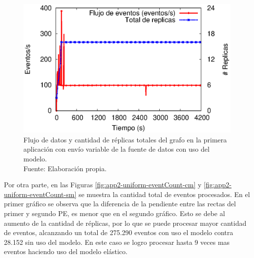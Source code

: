 \begin{figure}[!ht]
	\centering
	\captionsetup{justification=centering}
	\includegraphics[scale=0.7]{images/exp/app2/uniform/cm/processSystem.eps}
    \caption[Flujo de datos y cantidad de réplicas totales del grafo en la primera aplicación con envío variable de la fuente de datos con uso del modelo.]{Flujo de datos y cantidad de réplicas totales del grafo en la primera aplicación con envío variable de la fuente de datos con uso del modelo.\\Fuente: Elaboración propia.}
	\label{fig:app2-uniform-processSystem-cm}
\end{figure}



Por otra parte, en las Figuras \ref{fig:app2-uniform-eventCount-cm} y \ref{fig:app2-uniform-eventCount-sm} se muestra la cantidad total de eventos procesados. En el primer gráfico se observa que la diferencia de la pendiente entre las rectas del primer y segundo PE, es menor que en el segundo gráfico. Esto se debe al aumento de la cantidad de réplicas, por lo que se puede procesar mayor cantidad de eventos, alcanzando un total de 275.290 eventos con uso el modelo contra 28.152 sin uso del modelo. En este caso se logro procesar hasta 9 veces mas eventos haciendo uso del modelo elástico.

